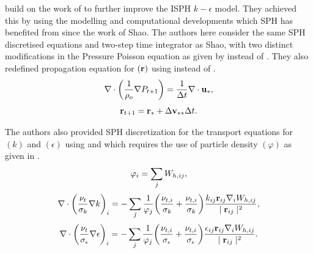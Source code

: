 \cite{Wang2020} build on the work of \cite{Shao2006} to further improve the ISPH $k-\epsilon$ model. They achieved this by using the modelling and computational developments which SPH has benefited from since the work of Shao.
The authors here consider the same SPH discretised equations and two-step time integrator as Shao, with two distinct modifications in the Pressure Poisson equation as given by  instead of . They also redefined propagation equation for $(\mathbf{r})$ using  instead of .
\begin{equation}
    \nabla \cdot \bigg( \frac{1}{\rho_o} \nabla P_{t+1} \bigg) = \frac{1}{\Delta t} \nabla \cdot \mathbf{u_*},
    \label{eq:Wang2020-correct-pressure-implicit}
\end{equation}
\begin{equation}
    \mathbf{r}_{t+1} = \mathbf{r}_* + \Delta \mathbf{v}_{**} \Delta t.
    \label{eq:Wang2020-correct-end}
\end{equation}

The authors also provided SPH discretization for the transport equations for $(k)$ and $(\epsilon)$ using  and  which requires the use of particle density $(\varphi)$ as given in .
\begin{equation}
    \varphi_i = \sum_j W_{h, ij},
    \label{eq:Wang2020-particle-density}
\end{equation}
\begin{equation}
    \nabla \cdot \bigg( \frac{\nu_t}{\sigma_k} \nabla k \bigg)_i = - \sum_j \frac{1}{\varphi_j} \bigg( \frac{\nu_{t,i}}{\sigma_k} + \frac{\nu_{t,i}}{\sigma_k}  \bigg) \frac{k_{ij} \mathbf{r}_{ij} \nabla_{i} W_{h, ij}}{\mid \mathbf{r}_{ij} \mid^{2}},
    \label{eq:Wang2020-k-laplacian}
\end{equation}
\begin{equation}
    \nabla \cdot \bigg( \frac{\nu_t}{\sigma_{\epsilon}} \nabla \epsilon \bigg)_i = - \sum_j \frac{1}{\varphi_j} \bigg( \frac{\nu_{t,i}}{\sigma_{\epsilon}} + \frac{\nu_{t,i}}{\sigma_{\epsilon}}  \bigg) \frac{\epsilon_{ij} \mathbf{r}_{ij} \nabla_{i} W_{h, ij}}{\mid \mathbf{r}_{ij} \mid^{2}}.
    \label{eq:Wang2020-eps-laplacian}
\end{equation}


